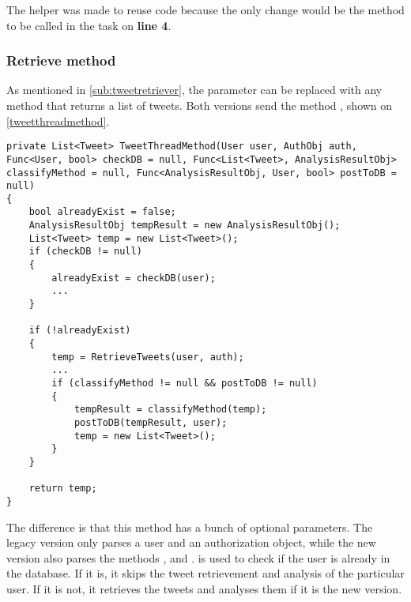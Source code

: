 The helper was made to reuse code because the only change would be the method
to be called in the task on \textbf{line 4}.\\

\subsubsection{Retrieve method}
As mentioned in \autoref{sub:tweetretriever}, the 
parameter can be replaced with any method that returns a list of tweets. Both
versions send the method , shown on
\autoref{tweetthreadmethod}. \\

\begin{minipage}[H]{\linewidth}
\begin{lstlisting}[caption = The TweetThreadMethod function., label =
tweetthreadmethod]
private List<Tweet> TweetThreadMethod(User user, AuthObj auth, Func<User, bool> checkDB = null, Func<List<Tweet>, AnalysisResultObj> classifyMethod = null, Func<AnalysisResultObj, User, bool> postToDB = null)
{
    bool alreadyExist = false;
    AnalysisResultObj tempResult = new AnalysisResultObj();
    List<Tweet> temp = new List<Tweet>();
    if (checkDB != null)
    {
        alreadyExist = checkDB(user);
		...
    }

    if (!alreadyExist)
    {
        temp = RetrieveTweets(user, auth);
		...	
        if (classifyMethod != null && postToDB != null)
        {
            tempResult = classifyMethod(temp); 
            postToDB(tempResult, user); 
            temp = new List<Tweet>();
        }
    }

    return temp;
}
\end{lstlisting}

\end{minipage}
The difference is that this method has a bunch of optional parameters. The
legacy version only parses a user and an authorization object, while the new
version also parses the methods ,  and
.
 is used to check if the user is already in the database. If it
is, it skips the tweet retrievement and analysis of the particular user. If it
is not, it retrieves the tweets and analyses them if it is the new version.\\


